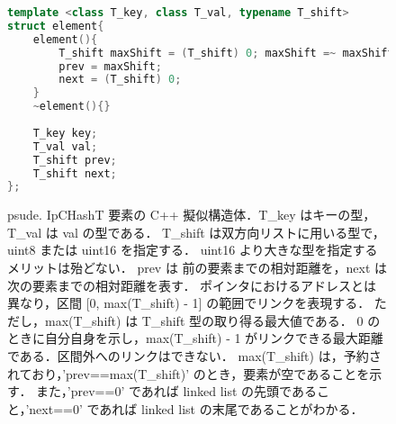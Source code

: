 \begin{figure} %
\begin{lstlisting}[language=C++]
template <class T_key, class T_val, typename T_shift>
struct element{
	element(){
		T_shift maxShift = (T_shift) 0; maxShift =~ maxShift;
		prev = maxShift;
		next = (T_shift) 0;
	}
	~element(){}
	
	T_key key;
	T_val val;
	T_shift prev;
	T_shift next;
};
\end{lstlisting}
\caption{
  psude.
  \protect\linebreak IpCHashT 要素の C++ 擬似構造体．T\_key はキーの型，T\_val は val の型である．
  T\_shift は双方向リストに用いる型で，uint8 または uint16 を指定する．
  uint16 より大きな型を指定するメリットは殆どない．
  prev は 前の要素までの相対距離を，next は 次の要素までの相対距離を表す．
  ポインタにおけるアドレスとは異なり，区間 [0, max(T\_shift) - 1] の範囲でリンクを表現する．
  ただし，max(T\_shift) は T\_shift 型の取り得る最大値である．
  0 のときに自分自身を示し，max(T\_shift) - 1 がリンクできる最大距離である．区間外へのリンクはできない．
  max(T\_shift) は，予約されており，'prev==max(T\_shift)' のとき，要素が空であることを示す．
  また，'prev==0' であれば linked list の先頭であること，'next==0' であれば linked list の末尾であることがわかる．
}
\label{fig_IpCHashT_struct}
\end{figure}

